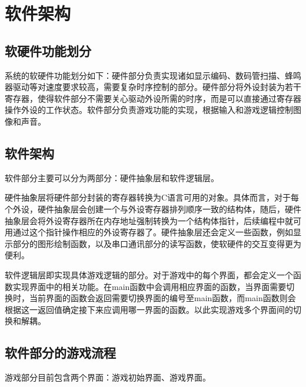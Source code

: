 \section{软件架构}

\subsection{软硬件功能划分}
系统的软硬件功能划分如下：硬件部分负责实现诸如显示编码、数码管扫描、蜂鸣器驱动等对速度要求较高，需要复杂时序控制的部分。硬件部分将外设封装为若干寄存器，使得软件部分不需要关心驱动外设所需的时序，而是可以直接通过寄存器操作外设的工作状态。软件部分负责游戏功能的实现，根据输入和游戏逻辑控制图像和声音。

\subsection{软件架构}
软件部分主要可以分为两部分：硬件抽象层和软件逻辑层。

硬件抽象层将硬件部分封装的寄存器转换为C语言可用的对象。具体而言，对于每个外设，硬件抽象层会创建一个与外设寄存器排列顺序一致的结构体，随后，硬件抽象层会将外设寄存器所在内存地址强制转换为一个结构体指针，后续编程中就可用通过这个指针操作相应的外设寄存器了。硬件抽象层还会定义一些函数，例如显示部分的图形绘制函数，以及串口通讯部分的读写函数，使软硬件的交互变得更为便利。

软件逻辑层即实现具体游戏逻辑的部分。对于游戏中的每个界面，都会定义一个函数实现界面中的相关功能。在main函数中会调用相应界面的函数，当界面需要切换时，当前界面的函数会返回需要切换界面的编号至main函数，而main函数则会根据这一返回值确定接下来应调用哪一界面的函数。以此实现游戏多个界面间的切换和解耦。

\subsection{软件部分的游戏流程}
游戏部分目前包含两个界面：游戏初始界面、游戏界面。

